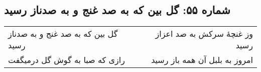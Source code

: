 \begin{center}
\section*{شماره ۵۵: گل بین که به صد غنج و به صدناز رسید}
\label{sec:055}
\begin{longtable}{l p{0.5cm} r}
گل بین که به صد غنج و به صدناز رسید
&&
وز غنچهٔ سرکش به صد اعزاز رسید
\\
رازی که صبا به گوش گل درمیگفت
&&
امروز به بلبل آن همه باز رسید
\\
\end{longtable}
\end{center}
